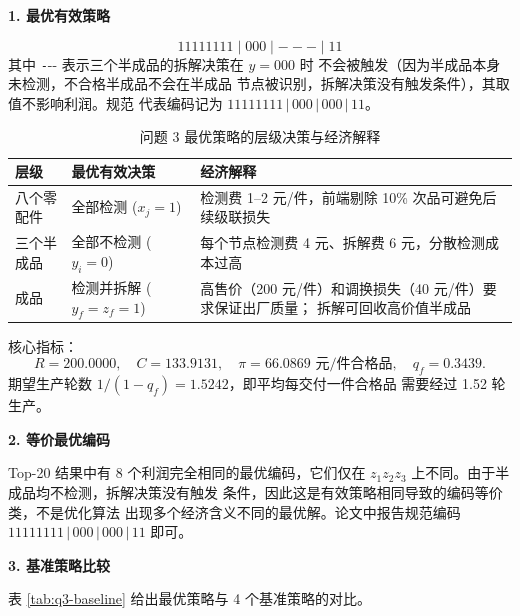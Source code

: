 \documentclass[withoutpreface,bwprint]{cumcmthesis}
\begin{document}
\textbf{1. 最优有效策略}

\begin{equation}
    \boxed{
    11111111 \mid 000 \mid {-}{-}{-} \mid 11
    }
    \label{eq:q3-opt}
\end{equation}
其中 \texttt{-}{-}{-} 表示三个半成品的拆解决策在 $y = 000$ 时
不会被触发（因为半成品本身未检测，不合格半成品不会在半成品
节点被识别，拆解决策没有触发条件），其取值不影响利润。规范
代表编码记为 $11111111\,|\,000\,|\,000\,|\,11$。

\begin{table}[htbp]
\centering
\caption{问题 3 最优策略的层级决策与经济解释}
\label{tab:q3-decisions}
\small
\begin{tabular}{@{}p{2.0cm}p{4.0cm}p{8.0cm}@{}}
\toprule[1.5pt]
\textbf{层级} & \textbf{最优有效决策} & \textbf{经济解释} \\
\midrule[1pt]
八个零配件 & 全部检测 ($x_j = 1$) &
检测费 1--2 元/件，前端剔除 10\% 次品可避免后续级联损失 \\
三个半成品 & 全部不检测 ($y_i = 0$) &
每个节点检测费 4 元、拆解费 6 元，分散检测成本过高 \\
成品 & 检测并拆解 ($y_f = z_f = 1$) &
高售价（200 元/件）和调换损失（40 元/件）要求保证出厂质量；
拆解可回收高价值半成品 \\
\bottomrule[1.5pt]
\end{tabular}
\end{table}

核心指标：
\begin{equation}
    R = 200.0000,\quad C = 133.9131,\quad
    \pi = 66.0869 \text{ 元/件合格品},\quad
    q_f = 0.3439.
\end{equation}
期望生产轮数 $1/(1 - q_f) = 1.5242$，即平均每交付一件合格品
需要经过 1.52 轮生产。

\textbf{2. 等价最优编码}

Top-20 结果中有 8 个利润完全相同的最优编码，它们仅在
$z_1 z_2 z_3$ 上不同。由于半成品均不检测，拆解决策没有触发
条件，因此这是有效策略相同导致的编码等价类，不是优化算法
出现多个经济含义不同的最优解。论文中报告规范编码
$11111111\,|\,000\,|\,000\,|\,11$ 即可。

\textbf{3. 基准策略比较}

表 \ref{tab:q3-baseline} 给出最优策略与 4 个基准策略的对比。
\end{document}
